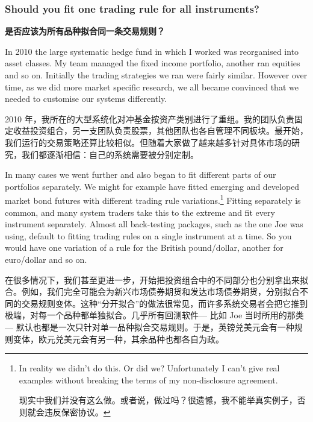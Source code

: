\subsubsection*{Should you fit one trading rule for all instruments?} \medskip \noindent\textbf{是否应该为所有品种拟合同一条交易规则？} \par \smallskip

\begin{englishblock} In 2010 the large systematic hedge fund in which I worked was reorganised into asset classes. My team managed the fixed income portfolio, another ran equities and so on. Initially the trading strategies we ran were fairly similar. However over time, as we did more market specific research, we all became convinced that we needed to customise our systems differently. \end{englishblock}

\begin{chineseblock} 2010 年，我所在的大型系统化对冲基金按资产类别进行了重组。我的团队负责固定收益投资组合，另一支团队负责股票，其他团队也各自管理不同板块。最开始，我们运行的交易策略还算比较相似。但随着大家做了越来越多针对具体市场的研究，我们都逐渐相信：自己的系统需要被分别定制。\end{chineseblock}

\bipairgap

\begin{englishblock} In many cases we went further and also began to fit different parts of our portfolios separately. We might for example have fitted emerging and developed market bond futures with different trading rule variations.\footnote{In reality we didn't do this. Or did we? Unfortunately I can't give real examples without breaking the terms of my non-disclosure agreement. \par 现实中我们并没有这么做。或者说，做过吗？很遗憾，我不能举真实例子，否则就会违反保密协议。} Fitting separately is common, and many system traders take this to the extreme and fit every instrument separately. Almost all back-testing packages, such as the one Joe was using, default to fitting trading rules on a single instrument at a time. So you would have one variation of a rule for the British pound/dollar, another for euro/dollar and so on. \end{englishblock}

\begin{chineseblock}在很多情况下，我们甚至更进一步，开始把投资组合中的不同部分也分别拿出来拟合。例如，我们完全可能会为新兴市场债券期货和发达市场债券期货，分别拟合不同的交易规则变体。这种“分开拟合”的做法很常见，而许多系统交易者会把它推到极端，对每一个品种都单独拟合。几乎所有回测软件--- 比如 Joe 当时所用的那类--- 默认也都是一次只针对单一品种拟合交易规则。于是，英镑兑美元会有一种规则变体，欧元兑美元会有另一种，其余品种也都各自为政。\end{chineseblock}

